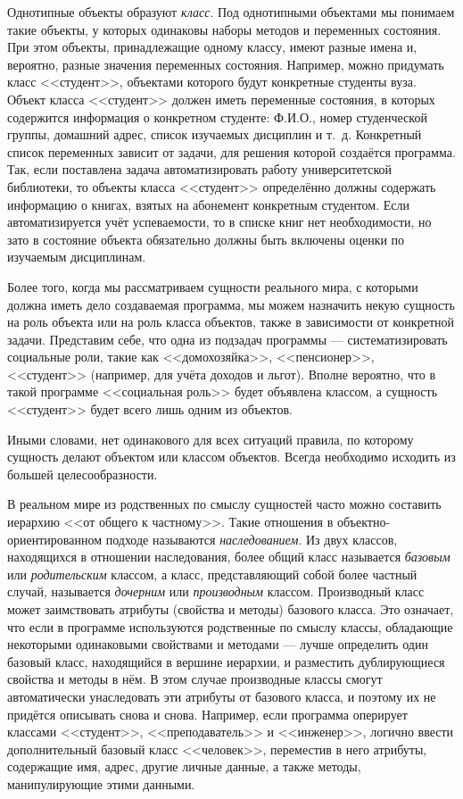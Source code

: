 Однотипные объекты образуют \emph{класс}. Под однотипными объектами мы понимаем такие объекты,
у которых одинаковы наборы методов и переменных состояния. При этом объекты, принадлежащие одному классу, имеют разные
имена и, вероятно, разные значения переменных состояния. Например, можно придумать класс <<студент>>, объектами которого
будут конкретные студенты вуза. Объект класса <<студент>> должен иметь переменные состояния, в которых содержится
информация о конкретном студенте: Ф.И.О., номер студенческой группы, домашний адрес, список изучаемых дисциплин и т.~д.
Конкретный список переменных зависит от задачи, для решения которой создаётся программа. Так, если поставлена задача
автоматизировать работу университетской библиотеки, то объекты класса <<студент>> определённо должны содержать информацию
о книгах, взятых на абонемент конкретным студентом. Если автоматизируется учёт успеваемости, то в списке книг нет
необходимости, но зато в состояние объекта обязательно должны быть включены оценки по изучаемым дисциплинам.

Более того, когда мы рассматриваем сущности реального мира, с которыми должна иметь дело создаваемая программа, мы можем
назначить некую сущность на роль объекта или на роль класса объектов, также в зависимости от конкретной задачи.
Представим себе, что одна из подзадач программы --- систематизировать социальные роли, такие как <<домохозяйка>>,
<<пенсионер>>, <<студент>> (например, для учёта доходов и льгот). Вполне вероятно, что в такой программе <<социальная роль>>
будет объявлена классом, а сущность <<студент>> будет всего лишь одним из объектов. 

Иными словами, нет одинакового для всех ситуаций правила, по которому сущность делают объектом или классом объектов.
Всегда необходимо исходить из большей целесообразности. 

В реальном мире из родственных по смыслу сущностей часто можно составить иерархию <<от общего к частному>>. Такие
отношения в объектно-ориентированном подходе называются
\emph{наследованием}. Из двух классов,
находящихся в отношении наследования, более общий класс называется
\emph{базовым} или
\emph{родительским} классом, а класс, представляющий собой более
частный случай, называется \emph{дочерним} или
\emph{производным} классом. Производный класс может заимствовать
атрибуты (свойства и методы) базового класса. Это означает, что если в программе используются родственные по смыслу
классы, обладающие некоторыми одинаковыми свойствами и методами --- лучше определить один базовый класс, находящийся в
вершине иерархии, и разместить дублирующиеся свойства и методы в нём. В этом случае производные классы смогут
автоматически унаследовать эти атрибуты от базового класса, и поэтому их не придётся описывать снова и снова. Например,
если программа оперирует классами <<студент>>, <<преподаватель>> и <<инженер>>, логично ввести дополнительный базовый класс
<<человек>>, переместив в него атрибуты, содержащие имя, адрес, другие личные данные, а также методы, манипулирующие
этими данными.


